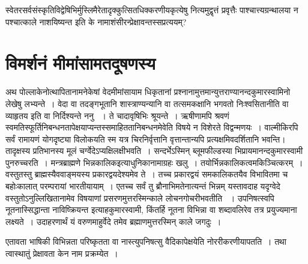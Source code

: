 स्वेतरसर्वसंस्कृतिविद्वेषिभिर्मुस्लिमैरेतादृक्कुत्सितधिक्करणीयकृत्येषु नित्यमुद्वृत्तं प्रवृत्तैः पाश्चात्त्यग्रन्थालया न पश्चात्काले नाशयिष्यन्त इति के नामाशंसीरन्प्रेक्षावन्तस्सप्रत्ययम्?

\vspace{-.35cm}


\section*{विमर्शनं मीमांसामतदूषणस्य}

अथ पोल्लाकेनोत्थापितानामनेकेषां वेदमीमांसायाम धिकृतानां प्रश्नानामुत्तमान्युत्तराण्यानन्दकुमारस्वामिनो  लेखेषु लभ्यन्ते~। वेदा वा तदङ्गभूतानि शास्त्राण्यन्यानि वा तत्समकक्षानि भगवतो निःश्वसितानीति वा व्याहृतय इति वा निर्दिश्यन्ते ननु ~। ते चादावृषिभिः श्रूयन्ते~। ऋषीणामपि श्रवणं स्वमतिस्फूर्तिनिबन्धनतापेक्षयाप्यन्तस्समाहिततानिबन्धनमेवेति विषये न विशेरते विद्वन्मणयः~। वाल्मीकिरपि सर्वं रामायणं योगदृष्ट्या विलोकयति स्म यत्र चिरनिर्वृत्तानि वृत्तान्तान्यपि प्रत्यक्षमिव\break दर्शितानि भवन्ति। तादृक्षस्य प्रतिभानस्य मूलं चर्ग्वेदेऽप्यक्षिलक्षीभवति~। सन्दर्भेऽस्मिन् ब्लूम\-फील्डस्या भिप्रायमानन्दकुमारस्वामी पुनरुच्चरति~। मन्त्रब्राह्मणे
 भिन्नकालिक\break इत्याधुनिकानामाग्रहः खलु~। तयोर्भिन्नकालिकत्वमकिञ्चित्करम्~। वस्तुतस्तु \hbox{ब्राह्म\-स्यैव}\break वाङ्मयस्य प्रकारद्वयदेश्यमेव ते~। तच्च प्रकारद्वयं समकालिकतयैव विभावितमा च बहोः\break कालात् परम्परायां भारतीयायाम्~। एतच्च सर्वं तु ब्रौनाभिमतेनात्यन्तं भिन्नम्  यस्तावदाह यदृग्वेदे वस्तुतोऽनुल्लिखितानामेव विषयाणां प्रसरणमुत्तरस्मिन्काले लोचनगोचरीभवतीति ~। उपनिषत्स्वपि नूतनास्सिद्धान्ता नाविष्क्रियन्त इत्याह\break कुमारस्वामी, किंतर्हि नूतना विभिन्ना वा शब्दावलिरेव तत्र प्रयुज्यमाना लक्ष्यते~। उदाहरणार्थं यं वरुणमाहुर्वेदे तमेव ब्रह्माणमुत्तरस्मिन् काले जगदुः~।

एतावता भाषिकी विभिन्नता परिष्कृतता वा नास्त्युपनिषत्सु वैदिकापेक्षयेति नोररीकरणीयापतति~। तथा त्वास्थातुं प्रेक्षावता केन नाम प्रक्रम्येत~।

